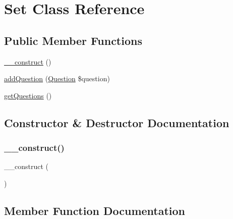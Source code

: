\hypertarget{class_classes_1_1_test_1_1_set}{}\section{Set Class Reference}
\label{class_classes_1_1_test_1_1_set}
\subsection*{Public Member Functions}
\begin{DoxyCompactItemize}
\item 
\hyperlink{class_classes_1_1_test_1_1_set_a095c5d389db211932136b53f25f39685}{\+\_\+\+\_\+construct} ()
\item 
\hyperlink{class_classes_1_1_test_1_1_set_aa27ea8191c7601c3811568b55f9e4c14}{add\+Question} (\hyperlink{class_classes_1_1_test_1_1_question}{Question} \$question)
\item 
\hyperlink{class_classes_1_1_test_1_1_set_aa5473162875f6946182770047be563d7}{get\+Questions} ()
\end{DoxyCompactItemize}


\subsection{Constructor \& Destructor Documentation}
\mbox{\label{class_classes_1_1_test_1_1_set_a095c5d389db211932136b53f25f39685}} 
\subsubsection{\texorpdfstring{\+\_\+\+\_\+construct()}{\_\_construct()}}
{\footnotesize\ttfamily \+\_\+\+\_\+construct (\begin{DoxyParamCaption}{ }\end{DoxyParamCaption})}



\subsection{Member Function Documentation}
\mbox{\label{class_classes_1_1_test_1_1_set_aa27ea8191c7601c3811568b55f9e4c14}} 
